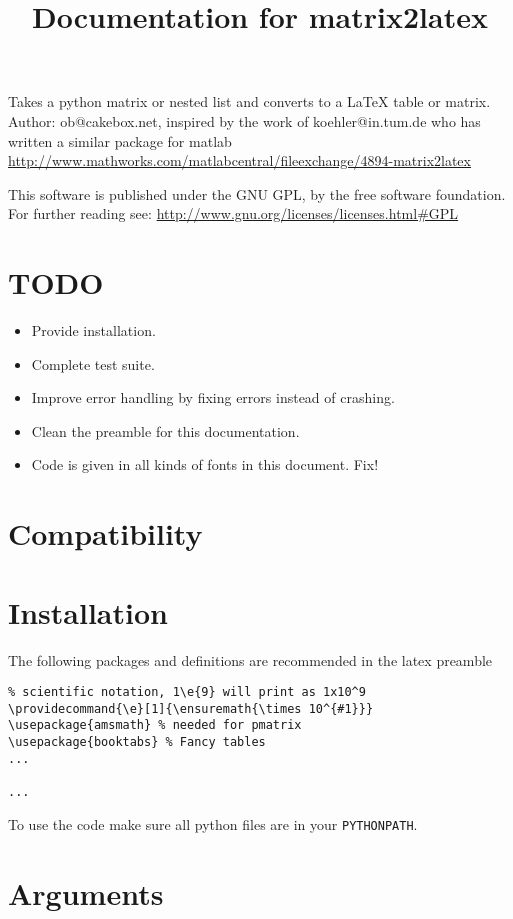 
\title{Documentation for matrix2latex}


\maketitle
Takes a python matrix or nested list and converts to a LaTeX table or matrix.
Author: ob@cakebox.net, inspired by the work of koehler@in.tum.de who has written
a similar package for matlab
\url{http://www.mathworks.com/matlabcentral/fileexchange/4894-matrix2latex}

This software is published under the GNU GPL, by the free software
foundation. For further reading see: 
\url{http://www.gnu.org/licenses/licenses.html#GPL}

\section{TODO}
\begin{itemize}
\item Provide installation.
\item Complete test suite.
\item Improve error handling by fixing errors instead of crashing.
\item Clean the preamble for this documentation.
\item Code is given in all kinds of fonts in this document. Fix!
\end{itemize}

\section{Compatibility}


\section{Installation}
The following packages and definitions are recommended in the latex preamble 
\begin{verbatim}
% scientific notation, 1\e{9} will print as 1x10^9
\providecommand{\e}[1]{\ensuremath{\times 10^{#1}}}
\usepackage{amsmath} % needed for pmatrix
\usepackage{booktabs} % Fancy tables
...

...
\end{verbatim}
To use the code make sure all python files are in your \verb!PYTHONPATH!.

\section{Arguments}
  
